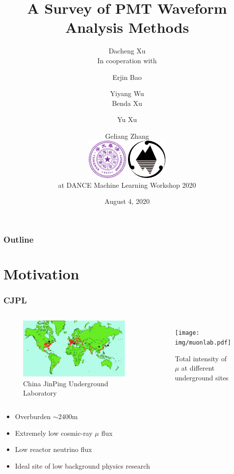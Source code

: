 \documentclass{beamer}
\title[Waveform Analysis]{A Survey of PMT Waveform Analysis Methods}
\author[Dacheng Xu]{Dacheng Xu \\ [4mm] In cooperation with \and Erjin Bao \and Yiyang Wu  \\ Benda Xu \and Yu Xu \and Geliang Zhang \\ [4mm] \includegraphics[height=2cm]{img/Tsinghua_University_Logo.png} \hspace{6mm} \includegraphics[height=2cm]{img/Js.png} \\ [4mm] at DANCE Machine Learning Workshop 2020 \\ [-8mm]}
\date[DANCE]{August 4, 2020}
\begin{document}
\frame{\titlepage}

\begin{frame}[noframenumbering]
\frametitle{Outline}
\thispagestyle{empty}
\tableofcontents
\end{frame}

\section{Motivation}
\begin{frame}
\setlength{\abovecaptionskip}{0mm}
\setlength{\belowcaptionskip}{0mm}
\setcounter{page}{0}
\frametitle{CJPL}
\begin{columns}
\begin{figure}
    \centering
    \caption{China JinPing Underground Laboratory\protect\footnotemark[1]}
    \includegraphics[width=1.0\linewidth]{img/WorldMap.jpg}
\end{figure}
\begin{figure}
    \centering
    \caption{Total intensity of $\mu$ at different underground sites\protect\footnotemark[2]}
    \texttt{[image: img/muonlab.pdf]}
\end{figure}
\end{columns}
\begin{itemize}
    \item Overburden $\sim2400\mathrm{m}$
    \item Extremely low cosmic-ray $\mu$ flux
    \item Low reactor neutrino flux
    \item Ideal site of low background physics research
\end{itemize}
\end{frame}
\end{document}
